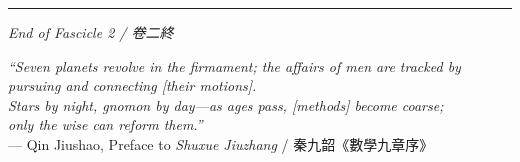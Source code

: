\documentclass[11pt,a4paper]{article}
\newcommand{\longline}{\noindent\rule{\textwidth}{0.4pt}}
\begin{document}
\vspace{1cm}

\begin{center}
\longline

\textit{End of Fascicle 2 / 卷二終}

\vspace{0.5cm}

{\small\color{notecolor}
\textit{``Seven planets revolve in the firmament; the affairs of men are tracked by pursuing and connecting [their motions].\\
Stars by night, gnomon by day---as ages pass, [methods] become coarse;\\
only the wise can reform them.''}\\
--- Qin Jiushao, Preface to \textit{Shuxue Jiuzhang} / 秦九韶《數學九章序》}
\end{center}
\end{document}
